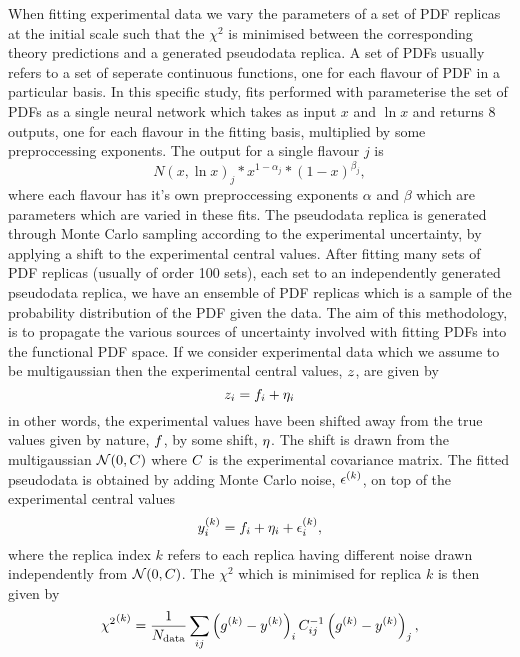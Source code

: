 When fitting experimental data we vary the parameters of a set of PDF replicas at
the initial scale such that the $\chi^2$ is minimised between the corresponding theory
predictions and a generated pseudodata replica. A set of PDFs usually refers to a set of
seperate continuous functions, one for each flavour of PDF in a particular basis.
In this specific study, fits performed with \nfit parameterise the set of PDFs
as a single neural network which takes as input $x$ and $\ln x$ and returns
8 outputs, one for each flavour in the fitting basis, multiplied by some
preproccessing exponents. The output for a single flavour $j$ is
\begin{equation}
    N(x, \ln x)_j * x^{1-\alpha_j} * (1-x)^{\beta_j},
\end{equation}
where each flavour has it's own preproccessing exponents $\alpha$ and $\beta$
which are parameters which are varied in these fits. The pseudodata replica is generated
through Monte Carlo sampling according to the experimental uncertainty, by
applying a shift to the experimental
central values. After fitting many sets of PDF replicas (usually of order 100 sets),
each set to an independently generated pseudodata replica, we have an ensemble of
PDF replicas which is a sample of the probability distribution of the PDF given
the data. The aim of this methodology, is to propagate the various sources of
uncertainty involved with fitting PDFs into the functional PDF space. If we
consider experimental data which we assume
to be multigaussian then the experimental central values, $z$, are given by
\begin{equation}
    z_{i} = f_i + \eta_i
\end{equation}
in other words, the experimental values have been shifted away from the true
values given by nature, $f$, by some shift, $\eta$. The shift is drawn from
the multigaussian $\mathcal{N}(0, C)$ where $C$ is the experimental covariance
matrix. The fitted pseudodata is obtained by adding Monte Carlo noise, $\epsilon^{(k)}$,
on top of the experimental central values
\begin{equation}
    y^{(k)}_{i} = f_i + \eta_i + \epsilon^{(k)}_{i},
\end{equation}
where the replica index $k$ refers to each replica having different noise drawn
independently from $\mathcal{N}(0, C)$. The $\chi^2$ which is minimised for
replica $k$ is then given by
\begin{equation}
    {\chi^2}^{(k)} = \frac{1}{N_{\rm data}} \sum_{ij} \left( g^{(k)} - y^{(k)} \right)_i C^{-1}_{ij} \left( g^{(k)} - y^{(k)} \right)_j,
\end{equation}
